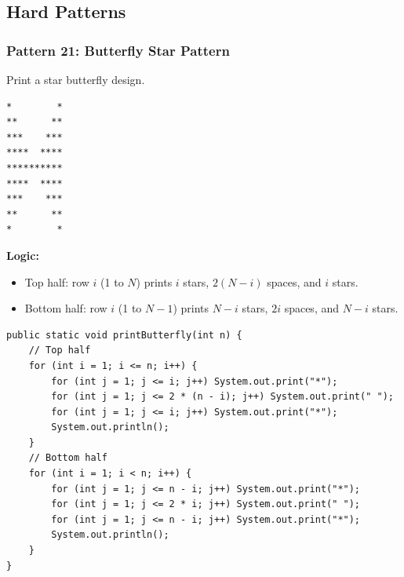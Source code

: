 \documentclass[12pt,a4paper,oneside]{book}
\begin{document}
\subsection{Hard Patterns}

\subsubsection{Pattern 21: Butterfly Star Pattern}
Print a star butterfly design.
\begin{lstlisting}[frame=single]
*        *
**      **
***    ***
****  ****
**********
****  ****
***    ***
**      **
*        *
\end{lstlisting}
\textbf{Logic:} 
\begin{itemize}
    \item Top half: row $i$ (1 to $N$) prints $i$ stars, $2(N-i)$ spaces, and $i$ stars.
    \item Bottom half: row $i$ (1 to $N-1$) prints $N-i$ stars, $2i$ spaces, and $N-i$ stars.
\end{itemize}
\begin{lstlisting}[caption={Butterfly Star Pattern}]
public static void printButterfly(int n) {
    // Top half
    for (int i = 1; i <= n; i++) {
        for (int j = 1; j <= i; j++) System.out.print("*");
        for (int j = 1; j <= 2 * (n - i); j++) System.out.print(" ");
        for (int j = 1; j <= i; j++) System.out.print("*");
        System.out.println();
    }
    // Bottom half
    for (int i = 1; i < n; i++) {
        for (int j = 1; j <= n - i; j++) System.out.print("*");
        for (int j = 1; j <= 2 * i; j++) System.out.print(" ");
        for (int j = 1; j <= n - i; j++) System.out.print("*");
        System.out.println();
    }
}
\end{lstlisting}
\end{document}

